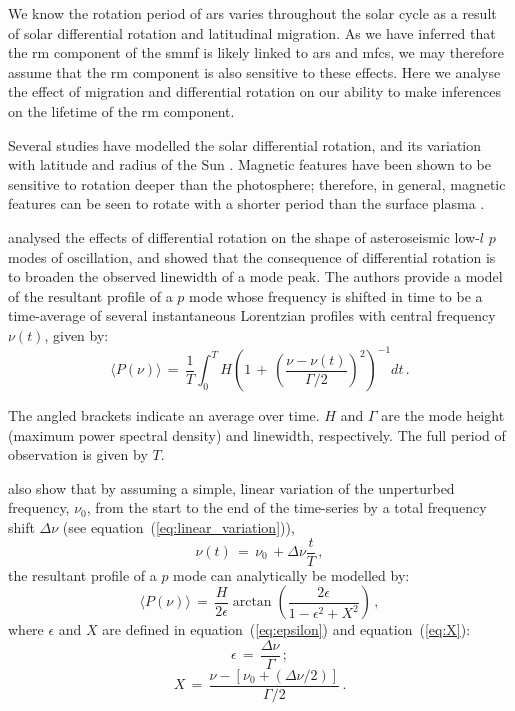 We know the rotation period of \glspl{ar} varies throughout the solar cycle as a result of solar differential rotation and latitudinal migration. As we have inferred that the \gls{rm} component of the \gls{smmf} is likely linked to \glspl{ar} and \glspl{mfc}, we may therefore assume that the \gls{rm} component is also sensitive to these effects. Here we analyse the effect of migration and differential rotation on our ability to make inferences on the lifetime of the \gls{rm} component.

Several studies have modelled the solar differential rotation, and its variation with latitude and radius of the Sun \citep[see][for an in depth review of the literature on solar differential rotation]{beck_comparison_2000, howe_solar_2009}. Magnetic features have been shown to be sensitive to rotation deeper than the photosphere; therefore, in general, magnetic features can be seen to rotate with a shorter period than the surface plasma \citep{howe_solar_2009}.

\citet{chaplin_distortion_2008} analysed the effects of differential rotation on the shape of asteroseismic low-$l$ $p$ modes of oscillation, and showed that the consequence of differential rotation is to broaden the observed linewidth of a mode peak. The authors provide a model of the resultant profile of a $p$ mode whose frequency is shifted in time to be a time-average of several instantaneous Lorentzian profiles with central frequency $\nu(t)$, given by:
%
\begin{equation}
\langle P(\nu) \rangle \, = \, \frac{1}{T} \int^T_0 H \left( 1 \, + \, \left( \frac{\nu - \nu(t)}{\Gamma /2} \right)^2 \right)^{-1} dt \, .
\label{eq:stacked_lorentzians}
\end{equation}

The angled brackets indicate an average over time. $H$ and $\Gamma$ are the mode height (maximum power spectral density) and linewidth, respectively. The full period of observation is given by $T$.

\citet{chaplin_distortion_2008} also show that by assuming a simple, linear variation of the unperturbed frequency, $\nu_0$, from the start to the end of the time-series by a total frequency shift $\Delta\nu$ (see equation~(\ref{eq:linear_variation})),
%
\begin{equation}
\nu(t) \, = \, \nu_0 \, +  \Delta\nu \frac{t}{T} \, ,
\label{eq:linear_variation}
\end{equation}
%
the resultant profile of a $p$ mode can analytically be modelled by:
%
\begin{equation}
\langle P(\nu) \rangle \, = \, \frac{H}{2\epsilon} \arctan \left( \frac{2 \epsilon}{1 - \epsilon^2 + X^2 } \right) \, ,
\label{eq:atan_lorentzians}
\end{equation}
%
where $\epsilon$ and $X$ are defined in equation~(\ref{eq:epsilon}) and equation~(\ref{eq:X}):
%
\begin{equation}
\epsilon \, = \, \frac{\Delta\nu}{\Gamma} \, ;
\label{eq:epsilon}
\end{equation}
%
\begin{equation}
X \, = \, \frac{\nu - [\nu_0 + (\Delta\nu/2)]}{\Gamma /2} \, .
\label{eq:X}
\end{equation}

